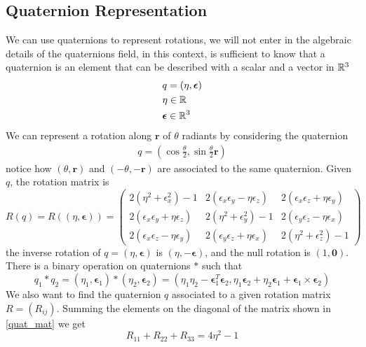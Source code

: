 \documentclass[10pt, letterpaper]{report}
\begin{document}
\subsection{Quaternion Representation}
We can use quaternions to represent rotations, we will not enter in the algebraic details of the quaternions field, in this context, is sufficient to know that a quaternion is an element that can be described with a scalar and a vector in ${\mathbb R}^3$
\begin{align}
    &q=(\eta,\boldsymbol{\epsilon})\\
    &\eta\in{\mathbb R}\\ 
    &\boldsymbol{\epsilon}\in {\mathbb R}^3
\end{align}
We can represent a rotation along $\mathbf r$ of $\theta$ radiants by considering the quaternion\begin{align}
    q=(\cos\frac{\theta}{2},\sin\frac{\theta}{2}\mathbf r)
\end{align}
notice how $(\theta,\mathbf r)$ and  $(-\theta,-\mathbf r)$ are associated to the same quaternion. Given $q$, the rotation matrix is\begin{equation}\label{quat_mat}
    R(q)=R((\eta,\boldsymbol{\epsilon}))=\begin{pmatrix}
2(\eta^2 + \epsilon_x^2) - 1 & 2(\epsilon_x\epsilon_y - \eta\epsilon_z) & 2(\epsilon_x\epsilon_z + \eta\epsilon_y) \\
2(\epsilon_x\epsilon_y + \eta\epsilon_z) & 2(\eta^2 + \epsilon_y^2) - 1 & 2(\epsilon_y\epsilon_z - \eta\epsilon_x) \\
2(\epsilon_x\epsilon_z - \eta\epsilon_y) & 2(\epsilon_y\epsilon_z + \eta\epsilon_x) & 2(\eta^2 + \epsilon_z^2) - 1
\end{pmatrix}
\end{equation}
the inverse rotation of $q=(\eta,\boldsymbol{\epsilon})$ is $(\eta,-\boldsymbol{\epsilon})$, and the null rotation is $(1,\mathbf 0)$. There is a binary operation on quaternions $*$ such that\begin{equation}
    q_1*q_2=(\eta_1,\boldsymbol{\epsilon}_1)*
    (\eta_2,\boldsymbol{\epsilon}_2)=(\eta_1\eta_2-\boldsymbol{\epsilon}_1^T\boldsymbol{\epsilon}_2, \eta_1\boldsymbol{\epsilon}_2+\eta_2\boldsymbol{\epsilon}_1+\boldsymbol{\epsilon}_1\times \boldsymbol{\epsilon}_2)
\end{equation}
We also want to find the quaternion $q$ associated to a given rotation matrix $R=(R_{ij})$. Summing the elements on the diagonal of the matrix shown in \eqref{quat_mat} we get\begin{equation}
    R_{11}+R_{22}+R_{33}=4\eta^2-1
\end{equation}
\end{document}
